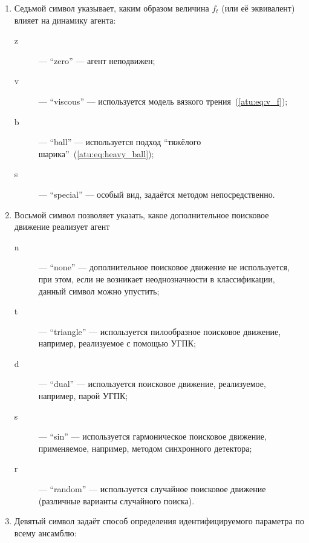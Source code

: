 \begin{enumerate}
  \item
    Седьмой символ указывает, каким образом величина $f_t$ (или её эквивалент) влияет на динамику агента:
    \begin{description}

      \item[z]  --- ``zero'' --- агент неподвижен;

      \item[v] --- ``viscous'' ---  используется модель вязкого трения~(\ref{atu:eq:v_f});

      \item[b] --- ``ball'' --- используется подход ``тяжёлого шарика''~(\ref{atu:eq:heavy_ball});

      \item[s] --- ``special'' --- особый вид, задаётся методом непосредственно.

    \end{description}

  \item
    Восьмой символ позволяет указать, какое дополнительное поисковое движение
    реализует агент
    \begin{description}

      \item[n]  --- ``none'' --- дополнительное поисковое движение не используется,
        при этом, если не возникает неоднозначности в классификации, данный символ можно упустить;

      \item[t] --- ``triangle'' ---  используется пилообразное поисковое движение, например, реализуемое
        с помощью УГПК;%

      \item[d] --- ``dual'' --- используется поисковое движение, реализуемое, например, парой УГПК;

      \item[s] --- ``sin'' ---  используется гармоническое поисковое движение, применяемое, например, методом синхронного детектора;

      \item[r] --- ``random'' ---  используется случайное поисковое движение (различные варианты случайного поиска).

    \end{description}




  \item
     Девятый символ задаёт способ определения идентифицируемого параметра по всему ансамблю:
    \begin{description}


\end{description}
\end{enumerate}
